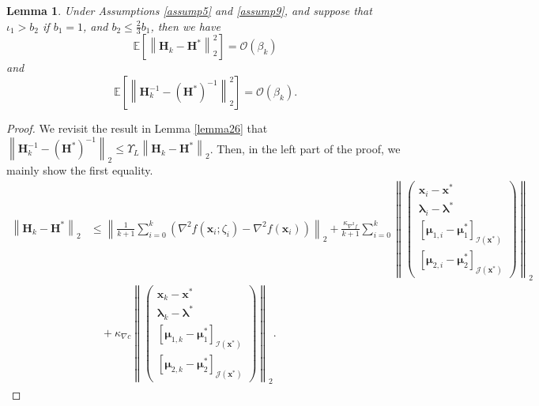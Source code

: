 \documentclass[aos]{imsart}
\numberwithin{equation}{section}
\theoremstyle{plain}
\newtheorem{lemma}{Lemma}
\begin{document}
\begin{appendix}
\begin{lemma}
\label{lemma29}
Under Assumptions \ref{assump5} and  \ref{assump9}, and suppose that $\iota_1>b_2$ if $b_1=1$, and $b_2 \leq \frac{2}{3}b_1$, then we have
    \begin{equation}
        \mathbb{E} \left[ \left\| \bm{H}_k - \bm{H}^{*}\right\|_2^2 \right] = \mathcal{O} \left( \beta_k \right)
    \end{equation}
    and 
     \begin{equation}
        \mathbb{E} \left[ \left\| \bm{H}_k^{-1} - \left(\bm{H}^{*}\right)^{-1}\right\|_2^2 \right] = \mathcal{O} \left( \beta_k \right).
    \end{equation}
\end{lemma}


\begin{proof}
    We revisit the result in Lemma \ref{lemma26} that $\left\| \bm{H}_k^{-1} - \left(\bm{H}^{*}\right)^{-1}\right\|_2 \leq \Upsilon_{L}  \left\| \bm{H}_k - \bm{H}^{*}\right\|_2$. Then, in the left part of the proof, we mainly show the first equality. 
    \begin{equation}
    \label{eq32}
        \begin{split}
            \left\| \bm{H}_k - \bm{H}^{*}\right\|_2 & \leq \left\| \frac{1}{k +1} \sum_{i=0}^{k} \left( \nabla^2 f(\bm{x}_i;\zeta_i) - \nabla^2 f(\bm{x}_i )\right) \right\|_2 + \frac{\kappa_{\nabla^2 f}}{k +1} \sum_{i=0}^{k} \left\|  \left( \begin{array}{c}
    \bm{x}_{i} - \bm{x}^{*}  \\
    \bm{\lambda}_{i} - \bm{\lambda}^{*} \\
    \left[ \bm{\mu}_{1,i} - \bm{\mu}_{1}^{*}\right]_{\mathcal{I}(\bm{x}^{*})} \\
    \left[ \bm{\mu}_{2,i} - \bm{\mu}_{2}^{*} \right]_{\mathcal{J}(\bm{x}^{*})} 
    \end{array} \right)  \right\|_2 \\
    &  \hspace{1em} + \kappa_{\nabla c} \left\|  \left( \begin{array}{c}
    \bm{x}_{k} - \bm{x}^{*}  \\
    \bm{\lambda}_{k} - \bm{\lambda}^{*} \\
    \left[ \bm{\mu}_{1,k} - \bm{\mu}_{1}^{*}\right]_{\mathcal{I}(\bm{x}^{*})} \\
    \left[ \bm{\mu}_{2,k} - \bm{\mu}_{2}^{*} \right]_{\mathcal{J}(\bm{x}^{*})} 
    \end{array} \right)  \right\|_2.

\end{split}
\end{equation}
\end{proof}
\end{appendix}
\end{document}

